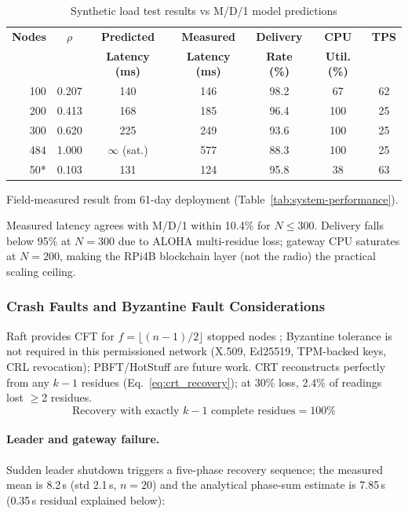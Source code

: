 \documentclass[pdflatex,sn-mathphys-num]{sn-jnl}
\theoremstyle{thmstyleone}
\theoremstyle{thmstyletwo}
\theoremstyle{thmstylethree}
\begin{document}
\begin{table}[htbp]
\centering
\caption{Synthetic load test results vs M/D/1 model predictions}
\label{tab:load_test}
\footnotesize
\begin{tabular}{r c c c c c c}
\toprule
\textbf{Nodes} & \textbf{$\rho$} & \textbf{Predicted} & \textbf{Measured} & \textbf{Delivery} & \textbf{CPU} & \textbf{TPS} \\
 & & \textbf{Latency (ms)} & \textbf{Latency (ms)} & \textbf{Rate (\%)} & \textbf{Util. (\%)} & \\
\midrule
100  & 0.207 & 140 & 146 & 98.2 & 67 & 62 \\
200  & 0.413 & 168 & 185 & 96.4 & 100 & 25 \\
300  & 0.620 & 225 & 249 & 93.6 & 100 & 25 \\
484  & 1.000 & $\infty$ (sat.) & 577 & 88.3 & 100 & 25 \\
50*  & 0.103   & 131     & 124     & 95.8   & 38      & 63      \\
\bottomrule
\end{tabular}
\vspace{2pt}
\raggedright\footnotesize *Field-measured result from 61-day deployment (Table~\ref{tab:system-performance}).
\end{table}

Measured latency agrees with M/D/1 within 10.4\% for $N \leq 300$. Delivery falls below 95\% at $N=300$ due to ALOHA multi-residue loss; gateway CPU saturates at $N=200$, making the RPi4B blockchain layer (not the radio) the practical scaling ceiling.

\subsubsection{Crash Faults and Byzantine Fault Considerations}
\label{subsubsec:byzantine}

Raft provides CFT for $f = \lfloor (n-1)/2 \rfloor$ stopped nodes \cite{ongaro2014raft}; Byzantine tolerance is not required in this permissioned network (X.509, Ed25519, TPM-backed keys, CRL revocation); PBFT/HotStuff \cite{castro1999practical,yin2019hotstuff} are future work. CRT reconstructs perfectly from any $k-1$ residues (Eq.~\ref{eq:crt_recovery}); at 30\% loss, 2.4\% of readings lost $\geq$2 residues.
\begin{equation}
\text{Recovery with exactly } k-1 \text{ complete residues} = 100\%
\label{eq:crt_recovery}
\end{equation}

\paragraph{Leader and gateway failure.}
Sudden leader shutdown triggers a five-phase recovery sequence; the measured mean is 8.2\,s (std 2.1\,s, $n=20$) and the analytical phase-sum estimate is 7.85\,s (0.35\,s residual explained below):
\end{document}
